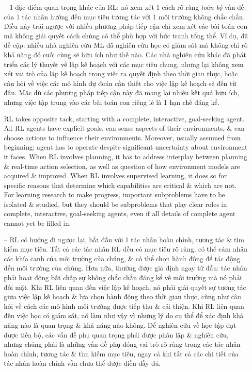 \documentclass{article}
\begin{document}
\begin{itemize}
\begin{itemize}
        -- 1 đặc điểm quan trọng khác của RL: nó xem xét 1 cách rõ ràng {\it toàn bộ} vấn đề của 1 tác nhân hướng đến mục tiêu tương tác với 1 môi trường không chắc chắn. Điều này trái ngược với nhiều phương pháp tiếp cận chỉ xem xét các bài toán con mà không giải quyết cách chúng có thể phù hợp với bức tranh tổng thể. Ví dụ, đã đề cập: nhiều nhà nghiên cứu ML đã nghiên cứu học có giám sát mà không chỉ rõ khả năng đó cuối cùng sẽ hữu ích như thế nào. Các nhà nghiên cứu khác đã phát triển các lý thuyết về lập kế hoạch với các mục tiêu chung, nhưng lại không xem xét vai trò của lập kế hoạch trong việc ra quyết định theo thời gian thực, hoặc câu hỏi về việc các mô hình dự đoán cần thiết cho việc lập kế hoạch sẽ đến từ đâu. Mặc dù các phương pháp tiếp cận này đã mang lại nhiều kết quả hữu ích, nhưng việc tập trung vào các bài toán con riêng lẻ là 1 hạn chế đáng kể.

        RL takes opposite tack, starting with a complete, interactive, goal-seeking agent. All RL agents have explicit goals, can sense aspects of their environments, \& can choose actions to influence their environments. Moreover, usually assumed from beginning: agent has to operate despite significant uncertainty about environment it faces. When RL involves planning, it has to address interplay between planning \& real-time action selection, as well as question of how environment models are acquired \& improved. When RL involves supervised learning, it does so for specific reasons that determine which capabilities are critical \& which are not. For learning research to make progress, important subproblems have to be isolated \& studied, but they should be subproblems that play clear roles in complete, interactive, goal-seeking agents, even if all details of complete agent cannot yet be filled in.

        -- RL có hướng đi ngược lại, bắt đầu với 1 tác nhân hoàn chỉnh, tương tác \& tìm kiếm mục tiêu. Tất cả các tác nhân RL đều có mục tiêu rõ ràng, có thể cảm nhận các khía cạnh của môi trường của chúng, \& có thể chọn hành động để tác động đến môi trường của chúng. Hơn nữa, thường được giả định ngay từ đầu: tác nhân phải hoạt động bất chấp sự không chắc chắn đáng kể về môi trường mà nó phải đối mặt. Khi RL liên quan đến việc lập kế hoạch, nó phải giải quyết sự tương tác giữa việc lập kế hoạch \& lựa chọn hành động theo thời gian thực, cũng như câu hỏi về cách các mô hình môi trường được tiếp thu \& cải thiện. Khi RL liên quan đến việc học có giám sát, nó làm như vậy vì những lý do cụ thể để xác định khả năng nào là quan trọng \& khả năng nào không. Để nghiên cứu về học tập đạt được tiến bộ, các vấn đề phụ quan trọng phải được phân lập \& nghiên cứu, nhưng chúng phải là những vấn đề phụ đóng vai trò rõ ràng trong các tác nhân hoàn chỉnh, tương tác \& tìm kiếm mục tiêu, ngay cả khi tất cả các chi tiết của tác nhân hoàn chỉnh vẫn chưa thể được điền đầy đủ.


\end{itemize}
\end{itemize}
\end{document}
